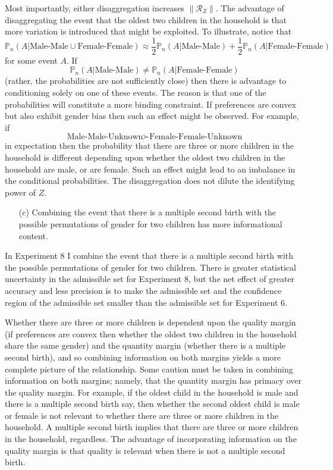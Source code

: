 \documentclass[10pt,a4paper,twoside]{article}
\numberwithin{equation}{section}
\begin{document}
Most importantly, either disaggregation increases $\|\mathcal{R}_Z\|$. The advantage of disaggregating the event that the oldest two children in the household is that more variation is introduced that might be exploited. To illustrate, notice that
\[\mathbb{P}_n(A|\text{Male-Male}\cup\text{Female-Female})\approx\frac{1}{2}\mathbb{P}_n(A|\text{Male-Male})+\frac{1}{2}\mathbb{P}_n(A|\text{Female-Female})\]
for some event $A$. If 
\[\mathbb{P}_n(A|\text{Male-Male})\neq\mathbb{P}_n(A|\text{Female-Female})\]
(rather, the probabilities are not sufficiently close) then there is advantage to conditioning solely on one of these events. The reason is that one of the probabilities will constitute a more binding constraint. If preferences are convex but also exhibit gender bias then such an effect might be observed. For example, if 
\[\text{Male-Male-Unknown}\succ\text{Female-Female-Unknown}\]
in expectation then the probability that there are three or more children in the household is different depending upon whether the oldest two children in the household are male, or are female. Such an effect might lead to an imbalance in the conditional probabilities. The disaggregation does not dilute the identifying power of $Z$.   
\begin{enumerate}
\item[(c)] Combining the event that there is a multiple second birth with the possible permutations of gender for two children has more informational content. 
\end{enumerate}
In Experiment 8 I combine the event that there is a multiple second birth with the possible permutations of gender for two children. There is greater statistical uncertainty in the admissible set for Experiment 8, but the net effect of greater accuracy and less precision is to make the admissible set and the confidence region of the admissible set smaller than the admissible set for Experiment 6. 

Whether there are three or more children is dependent upon the quality margin (if preferences are convex then whether the oldest two children in the household share the same gender) and the quantity margin (whether there is a multiple second birth), and so combining information on both margins yields a more complete picture of the relationship. Some caution must be taken in combining information on both margins; namely, that the quantity margin has primacy over the quality margin. For example, if the oldest child in the household is male and there is a multiple second birth say, then whether the second oldest child is male or female is not relevant to whether there are three or more children in the household. A multiple second birth implies that there are three or more children in the household, regardless. The advantage of incorporating information on the quality margin is that quality is relevant when there is not a multiple second birth. 
\end{document}
